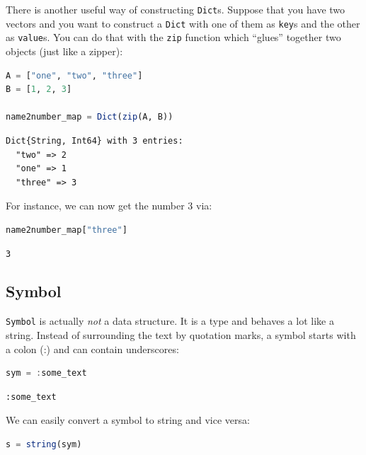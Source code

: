 \documentclass[
  notoc %
]{tufte-book}
\newcommand{\passthrough}[1]{#1}
\begin{document}
There is another useful way of constructing
\passthrough{\lstinline!Dict!}s. Suppose that you have two vectors and
you want to construct a \passthrough{\lstinline!Dict!} with one of them
as \passthrough{\lstinline!key!}s and the other as
\passthrough{\lstinline!value!}s. You can do that with the
\passthrough{\lstinline!zip!} function which ``glues'' together two
objects (just like a zipper):

\begin{lstlisting}[language=Julia]
A = ["one", "two", "three"]
B = [1, 2, 3]

name2number_map = Dict(zip(A, B))
\end{lstlisting}

\begin{lstlisting}[language=Output]
Dict{String, Int64} with 3 entries:
  "two" => 2
  "one" => 1
  "three" => 3
\end{lstlisting}

For instance, we can now get the number 3 via:

\begin{lstlisting}[language=Julia]
name2number_map["three"]
\end{lstlisting}

\begin{lstlisting}[language=Output]
3
\end{lstlisting}

\hypertarget{sec:symbol}{%
\subsection{Symbol}\label{sec:symbol}}

\passthrough{\lstinline!Symbol!} is actually \emph{not} a data
structure. It is a type and behaves a lot like a string. Instead of
surrounding the text by quotation marks, a symbol starts with a colon
(:) and can contain underscores:

\begin{lstlisting}[language=Julia]
sym = :some_text
\end{lstlisting}

\begin{lstlisting}[language=Output]
:some_text
\end{lstlisting}

We can easily convert a symbol to string and vice versa:

\begin{lstlisting}[language=Julia]
s = string(sym)
\end{lstlisting}
\end{document}
